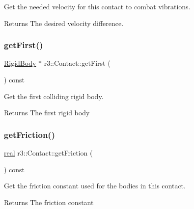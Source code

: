 Get the needed velocity for this contact to combat vibrations. 

\begin{DoxyReturn}{Returns}
The desired velocity difference. 
\end{DoxyReturn}
\mbox{\label{classr3_1_1_contact_adf157981ebfd1552521afe7b25e9239c}} 
\subsubsection{\texorpdfstring{get\+First()}{getFirst()}}
{\footnotesize\ttfamily \mbox{\hyperlink{classr3_1_1_rigid_body}{Rigid\+Body}} $\ast$ r3\+::\+Contact\+::get\+First (\begin{DoxyParamCaption}{ }\end{DoxyParamCaption}) const}



Get the first colliding rigid body. 

\begin{DoxyReturn}{Returns}
The first rigid body 
\end{DoxyReturn}
\mbox{\label{classr3_1_1_contact_a1a547c3852733960001cc5fe0fe06790}} 
\subsubsection{\texorpdfstring{get\+Friction()}{getFriction()}}
{\footnotesize\ttfamily \mbox{\hyperlink{namespacer3_ab2016b3e3f743fb735afce242f0dc1eb}{real}} r3\+::\+Contact\+::get\+Friction (\begin{DoxyParamCaption}{ }\end{DoxyParamCaption}) const}



Get the friction constant used for the bodies in this contact. 

\begin{DoxyReturn}{Returns}
The friction constant 
\end{DoxyReturn}
\mbox{\label{classr3_1_1_contact_afe0f0a9a42b4b1f8bd8a61f0b6a4afdd}} 
